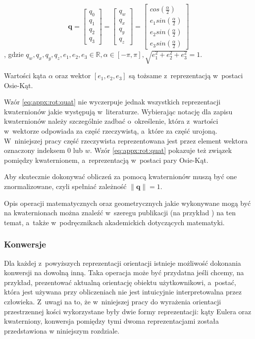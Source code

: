 \begin{equation}
	\label{eq:appx:rot:quat}
	\mathbf{q} =
	\begin{bmatrix}
		q_0 \\
		q_1 \\
		q_2 \\
		q_3 
	\end{bmatrix} 
	= 	
	\begin{bmatrix}
		q_w \\
		q_x \\
		q_y \\
		q_z 
	\end{bmatrix} 
	= 
	\begin{bmatrix}
		cos(\frac{\alpha}{2})    \\
		e_1sin(\frac{\alpha}{2}) \\
		e_2sin(\frac{\alpha}{2}) \\
		e_3sin(\frac{\alpha}{2}) 
	\end{bmatrix}
\end{equation}
, gdzie $q_w,q_x,q_y,q_z,e_1,e_2,e_3 \in \mathbb{R}, \alpha \in [-\pi, \pi], \sqrt{e_1^2 + e_2^2 + e_3^2} = 1$.
																													
Wartości kąta $\alpha$ oraz wektor $[e_1,e_2,e_3]$ są tożsame z~reprezentacją w~postaci Osie-Kąt.
																													
Wzór \ref{eq:appx:rot:quat} nie wyczerpuje jednak wszystkich reprezentacji kwaternionów jakie występują w~literaturze. Wybierając notację dla zapisu kwaternionów należy szczególnie zadbać o~określenie, która z~wartości w~wektorze odpowiada za część rzeczywistą, a~które za część urojoną. W~niniejszej pracy część rzeczywista reprezentowana jest przez element wektora oznaczony indeksem $0$ lub $w$. Wzór \ref{eq:appx:rot:quat} pokazuje też związek pomiędzy kwaternionem, a~reprezentacją w~postaci pary Osie-Kąt.
																													
Aby skutecznie dokonywać obliczeń za pomocą kwaternionów muszą być one znormalizowane, czyli spełniać zależność $\|\mathbf{q}\| = 1$.
																													
Opis operacji matematycznych oraz geometrycznych jakie wykonywane mogą być na kwaternionach można znaleźć w~szeregu publikacji (na przykład \cite{Dantam2014}) na ten temat, a~także w~podręcznikach akademickich dotyczących matematyki.
																													
\subsubsection*{Konwersje}
Dla każdej z~powyższych reprezentacji orientacji istnieje możliwość dokonania konwersji na dowolną inną. Taka operacja może być przydatna jeśli chcemy, na przykład, prezentować aktualną orientację obiektu użytkownikowi, a~postać, która jest używana przy obliczeniach nie jest intuicyjnie interpretowalna przez człowieka. Z~uwagi na to, że w~niniejszej pracy do wyrażenia orientacji przestrzennej kości wykorzystane były dwie formy reprezentacji: kąty Eulera oraz kwaterniony, konwersja pomiędzy tymi dwoma reprezentacjami została przedstawiona w niniejszym rozdziale.

